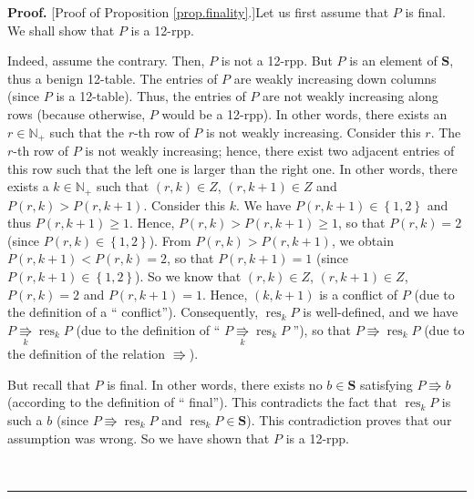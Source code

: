 \documentclass[numbers=enddot,12pt,final,onecolumn,notitlepage]{scrartcl}%
\theoremstyle{definition}
\newenvironment{proof}[1][Proof]{\noindent\textbf{#1.} }{\ \rule{0.5em}{0.5em}}
\newenvironment{verlong}{}{}
\begin{document}
\begin{verlong}
\begin{proof}
[Proof of Proposition \ref{prop.finality}.]Let us first assume that $P$ is
final. We shall show that $P$ is a 12-rpp.

Indeed, assume the contrary. Then, $P$ is not a 12-rpp. But $P$ is an element
of $\mathbf{S}$, thus a benign 12-table. The entries of $P$ are weakly
increasing down columns (since $P$ is a 12-table). Thus, the entries of $P$
are not weakly increasing along rows (because otherwise, $P$ would be a
12-rpp). In other words, there exists an $r\in\mathbb{N}_{+}$ such that the
$r$-th row of $P$ is not weakly increasing. Consider this $r$. The $r$-th row
of $P$ is not weakly increasing; hence, there exist two adjacent entries of
this row such that the left one is larger than the right one. In other words,
there exists a $k\in\mathbb{N}_{+}$ such that $\left(  r,k\right)  \in Z$,
$\left(  r,k+1\right)  \in Z$ and $P\left(  r,k\right)  >P\left(
r,k+1\right)  $. Consider this $k$. We have $P\left(  r,k+1\right)
\in\left\{  1,2\right\}  $ and thus $P\left(  r,k+1\right)  \geq1$. Hence,
$P\left(  r,k\right)  >P\left(  r,k+1\right)  \geq1$, so that $P\left(
r,k\right)  =2$ (since $P\left(  r,k\right)  \in\left\{  1,2\right\}  $). From
$P\left(  r,k\right)  >P\left(  r,k+1\right)  $, we obtain $P\left(
r,k+1\right)  <P\left(  r,k\right)  =2$, so that $P\left(  r,k+1\right)  =1$
(since $P\left(  r,k+1\right)  \in\left\{  1,2\right\}  $). So we know that
$\left(  r,k\right)  \in Z$, $\left(  r,k+1\right)  \in Z$, $P\left(
r,k\right)  =2$ and $P\left(  r,k+1\right)  =1$. Hence, $\left(  k,k+1\right)
$ is a conflict of $P$ (due to the definition of a \textquotedblleft
conflict\textquotedblright). Consequently, $\operatorname*{res}\nolimits_{k}P$
is well-defined, and we have $P\underset{k}{\Rrightarrow}\operatorname*{res}%
\nolimits_{k}P$ (due to the definition of \textquotedblleft%
$P\underset{k}{\Rrightarrow}\operatorname*{res}\nolimits_{k}P$%
\textquotedblright), so that $P\Rrightarrow\operatorname*{res}\nolimits_{k}P$
(due to the definition of the relation $\Rrightarrow$).

But recall that $P$ is final. In other words, there exists no $b\in\mathbf{S}$
satisfying $P\Rrightarrow b$ (according to the definition of \textquotedblleft
final\textquotedblright). This contradicts the fact that $\operatorname*{res}%
\nolimits_{k}P$ is such a $b$ (since $P\Rrightarrow\operatorname*{res}%
\nolimits_{k}P$ and $\operatorname*{res}\nolimits_{k}P\in\mathbf{S}$). This
contradiction proves that our assumption was wrong. So we have shown that $P$
is a 12-rpp.


\end{proof}
\end{verlong}
\end{document}
